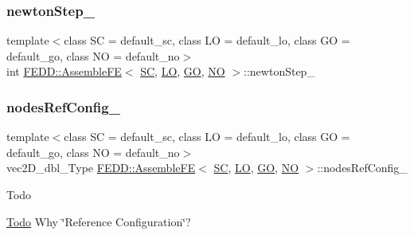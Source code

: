 \subsubsection{\texorpdfstring{newton\+Step\+\_\+}{newtonStep\_}}
{\footnotesize\ttfamily template$<$class SC  = default\+\_\+sc, class LO  = default\+\_\+lo, class GO  = default\+\_\+go, class NO  = default\+\_\+no$>$ \\
int \hyperlink{classFEDD_1_1AssembleFE}{F\+E\+D\+D\+::\+Assemble\+FE}$<$ \hyperlink{fe__test__laplace_8cpp_a79c7e86a57edbb2a5a53242bcd04e41e}{SC}, \hyperlink{fe__test__laplace_8cpp_ad6a38c9f07d3fd633eefca5bccad8410}{LO}, \hyperlink{fe__test__laplace_8cpp_afa2946b509009b4f45eb04bd8c5b27d9}{GO}, \hyperlink{fe__test__laplace_8cpp_a5e24f37b28787429872b6ecb1d0417ce}{NO} $>$\+::newton\+Step\+\_\+\hspace{0.3cm}{\ttfamily [protected]}}

\mbox{\label{classFEDD_1_1AssembleFE_ab2892bff598d5a4f784d4f30ddf4836c}} 
\subsubsection{\texorpdfstring{nodes\+Ref\+Config\+\_\+}{nodesRefConfig\_}}
{\footnotesize\ttfamily template$<$class SC  = default\+\_\+sc, class LO  = default\+\_\+lo, class GO  = default\+\_\+go, class NO  = default\+\_\+no$>$ \\
vec2\+D\+\_\+dbl\+\_\+\+Type \hyperlink{classFEDD_1_1AssembleFE}{F\+E\+D\+D\+::\+Assemble\+FE}$<$ \hyperlink{fe__test__laplace_8cpp_a79c7e86a57edbb2a5a53242bcd04e41e}{SC}, \hyperlink{fe__test__laplace_8cpp_ad6a38c9f07d3fd633eefca5bccad8410}{LO}, \hyperlink{fe__test__laplace_8cpp_afa2946b509009b4f45eb04bd8c5b27d9}{GO}, \hyperlink{fe__test__laplace_8cpp_a5e24f37b28787429872b6ecb1d0417ce}{NO} $>$\+::nodes\+Ref\+Config\+\_\+\hspace{0.3cm}{\ttfamily [protected]}}

\begin{DoxyRefDesc}{Todo}
\item[\hyperlink{todo__todo000006}{Todo}]Why \char`\"{}\+Reference Configuration\char`\"{}? \end{DoxyRefDesc}
\mbox{\label{classFEDD_1_1AssembleFE_a1b7f9f820f3da30ff7dd8438ada14b3b}} 
